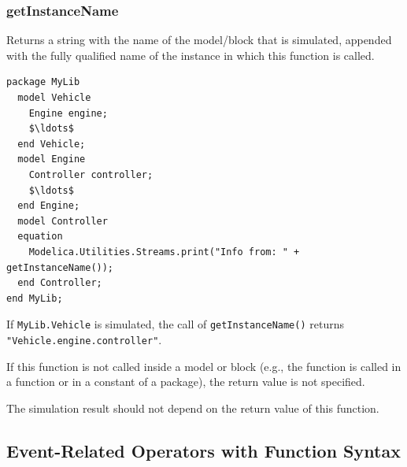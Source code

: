 \subsubsection{getInstanceName}\label{getinstancename}

Returns a string with the name of the model/block that is simulated, appended with the fully qualified name of the instance in which this function is called.

\begin{example}
\begin{lstlisting}[language=modelica]
package MyLib
  model Vehicle
    Engine engine;
    $\ldots$
  end Vehicle;
  model Engine
    Controller controller;
    $\ldots$
  end Engine;
  model Controller
  equation
    Modelica.Utilities.Streams.print("Info from: " + getInstanceName());
  end Controller;
end MyLib;
\end{lstlisting}
If \lstinline!MyLib.Vehicle! is simulated, the call of \lstinline!getInstanceName()! returns \lstinline!"Vehicle.engine.controller"!.
\end{example}

If this function is not called inside a model or block (e.g., the function is called in a function or in a constant of a package), the return value is not specified.

The simulation result should not depend on the return value of this function.

\subsection{Event-Related Operators with Function Syntax}\label{event-related-operators-with-function-syntax}


